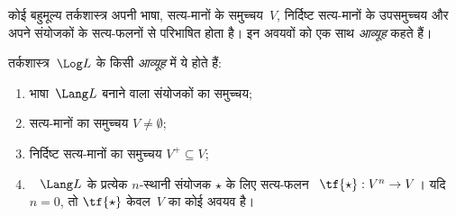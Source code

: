 \documentclass[../../../include/open-logic-section]{subfiles}
\begin{document}


कोई बहुमूल्य तर्कशास्त्र अपनी भाषा, सत्य-मानों के समुच्चय~$V$, निर्दिष्ट
सत्य-मानों के उपसमुच्चय और अपने संयोजकों के सत्य-फलनों से परिभाषित होता
है। इन अवयवों को एक साथ \emph{आव्यूह} कहते हैं।

\begin{defn}[आव्यूह]
तर्कशास्त्र~$\Log L$ के किसी \emph{आव्यूह} में ये होते हैं:
\begin{enumerate}
\item भाषा~$\Lang L$ बनाने वाला संयोजकों का समुच्चय;
\item सत्य-मानों का समुच्चय $V \neq \emptyset$;
\item निर्दिष्ट सत्य-मानों का समुच्चय $V^+ \subseteq V$;
\item ~ $\Lang L$ के प्रत्येक $n$-स्थानी संयोजक $\star$ के लिए सत्य-फलन
~$\tf{\star} : V^n \to V$। यदि $n = 0$, तो $\tf{\star}$ केवल~$V$ का कोई
अवयव है।
\end{enumerate}
\end{defn}
\end{document}
